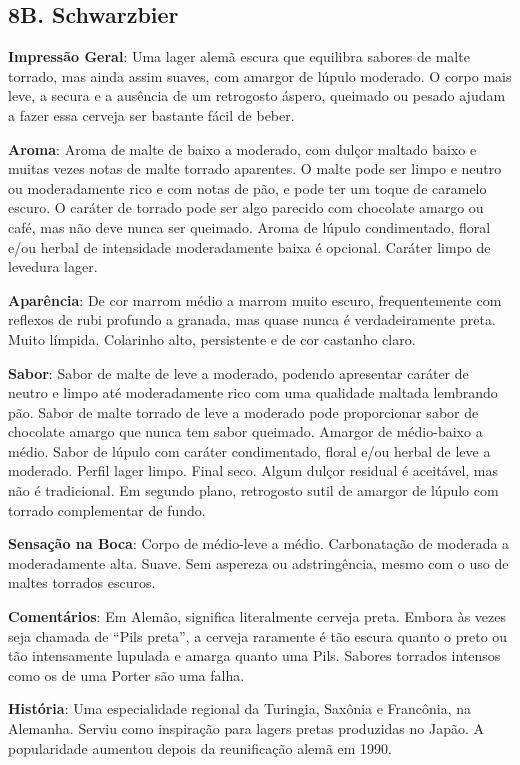 \subsection*{8B. Schwarzbier}
\textbf{Impressão Geral}: Uma lager alemã escura que equilibra sabores de malte torrado, mas ainda assim suaves, com amargor de lúpulo moderado. O corpo mais leve, a secura e a ausência de um retrogosto áspero, queimado ou pesado ajudam a fazer essa cerveja ser bastante fácil de beber.

\textbf{Aroma}: Aroma de malte de baixo a moderado, com dulçor maltado baixo e muitas vezes notas de malte torrado aparentes. O malte pode ser limpo e neutro ou moderadamente rico e com notas de pão, e pode ter um toque de caramelo escuro. O caráter de torrado pode ser algo parecido com chocolate amargo ou café, mas não deve nunca ser queimado. Aroma de lúpulo condimentado, floral e/ou herbal de intensidade moderadamente baixa é opcional. Caráter limpo de levedura lager.

\textbf{Aparência}: De cor marrom médio a marrom muito escuro, frequentemente com reflexos de rubi profundo a granada, mas quase nunca é verdadeiramente preta. Muito límpida. Colarinho alto, persistente e de cor castanho claro.

\textbf{Sabor}: Sabor de malte de leve a moderado, podendo apresentar caráter de neutro e limpo até moderadamente rico com uma qualidade maltada lembrando pão. Sabor de malte torrado de leve a moderado pode proporcionar sabor de chocolate amargo que nunca tem sabor queimado. Amargor de médio-baixo a médio. Sabor de lúpulo com caráter condimentado, floral e/ou herbal de leve a moderado. Perfil lager limpo. Final seco. Algum dulçor residual é aceitável, mas não é tradicional. Em segundo plano, retrogosto sutil de amargor de lúpulo com torrado complementar de fundo.

\textbf{Sensação na Boca}: Corpo de médio-leve a médio. Carbonatação de moderada a moderadamente alta. Suave. Sem aspereza ou adstringência, mesmo com o uso de maltes torrados escuros.

\textbf{Comentários}: Em Alemão, significa literalmente cerveja preta. Embora às vezes seja chamada de “Pils preta”, a cerveja raramente é tão escura quanto o preto ou tão intensamente lupulada e amarga quanto uma Pils. Sabores torrados intensos como os de uma Porter são uma falha.

\textbf{História}: Uma especialidade regional da Turingia, Saxônia e Francônia, na Alemanha. Serviu como inspiração para lagers pretas produzidas no Japão. A popularidade aumentou depois da reunificação alemã em 1990.

